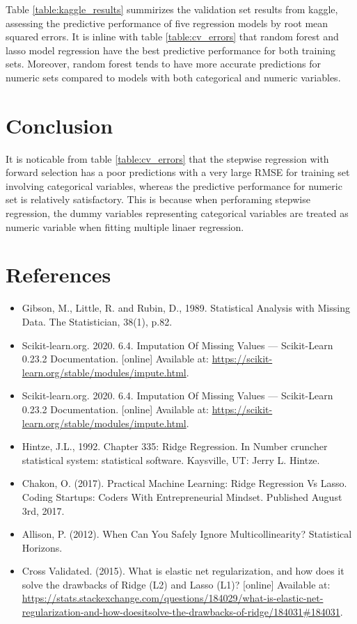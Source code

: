 \documentclass[letterpaper,12pt,twoside,]{pinp}
\providecommand{\tightlist}{%
  \setlength{\itemsep}{0pt}\setlength{\parskip}{0pt}}
\begin{document}
Table \ref{table:kaggle_results} summirizes the validation set results
from kaggle, assessing the predictive performance of five regression
models by root mean squared errors. It is inline with table
\ref{table:cv_errors} that random forest and lasso model regression have
the best predictive performance for both training sets. Moreover, random
forest tends to have more accurate predictions for numeric sets compared
to models with both categorical and numeric variables.

\hypertarget{conclusion}{%
\section{Conclusion}\label{conclusion}}

It is noticable from table \ref{table:cv_errors} that the stepwise
regression with forward selection has a poor predictions with a very
large RMSE for training set involving categorical variables, whereas the
predictive performance for numeric set is relatively satisfactory. This
is because when perforaming stepwise regression, the dummy variables
representing categorical variables are treated as numeric variable when
fitting multiple linaer regression.

\hypertarget{references}{%
\section{References}\label{references}}

\begin{itemize}
\tightlist
\item
  Gibson, M., Little, R. and Rubin, D., 1989. Statistical Analysis with
  Missing Data. The Statistician, 38(1), p.82.
\item
  Scikit-learn.org. 2020. 6.4. Imputation Of Missing Values ---
  Scikit-Learn 0.23.2 Documentation. {[}online{]} Available at:
  \url{https://scikit-learn.org/stable/modules/impute.html}.
\item
  Scikit-learn.org. 2020. 6.4. Imputation Of Missing Values ---
  Scikit-Learn 0.23.2 Documentation. {[}online{]} Available at:
  \url{https://scikit-learn.org/stable/modules/impute.html}.
\item
  Hintze, J.L., 1992. Chapter 335: Ridge Regression. In Number cruncher
  statistical system: statistical software. Kaysville, UT: Jerry L.
  Hintze.
\item
  Chakon, O. (2017). Practical Machine Learning: Ridge Regression Vs
  Lasso. Coding Startups: Coders With Entrepreneurial Mindset. Published
  August 3rd, 2017.
\item
  Allison, P. (2012). When Can You Safely Ignore Multicollinearity?
  Statistical Horizons.
\item
  Cross Validated. (2015). What is elastic net regularization, and how
  does it solve the drawbacks of Ridge (L2) and Lasso (L1)? {[}online{]}
  Available at:
  \url{https://stats.stackexchange.com/questions/184029/what-is-elastic-net-regularization-and-how-doesitsolve-the-drawbacks-of-ridge/184031\#184031}.
\end{itemize}
\end{document}
